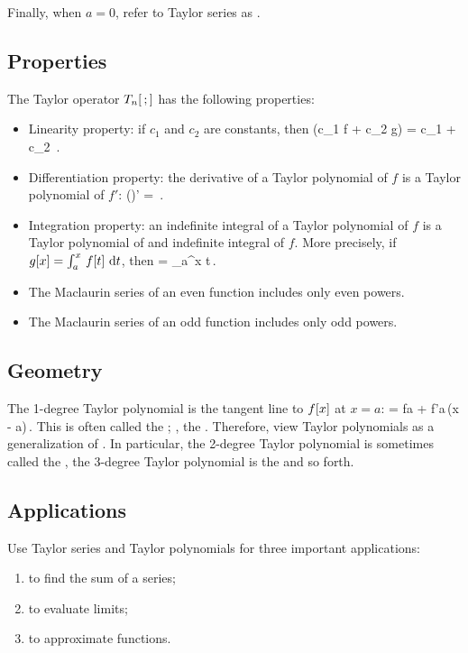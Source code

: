 Finally, when $a = 0$, refer to Taylor series as .


\subsection{Properties}
The Taylor operator $T_{n}{}\!\left[{{}\,;{}}\right]$ has the following properties:
\begin{itemize}
\item Linearity property: if $c_1$ and $c_2$ are constants, then 
\beq
{}(c_1 f + c_2 g) = c_1  + c_2 \,.
\eeq
%
\item Differentiation property: the derivative of a Taylor polynomial of $f$ is a Taylor polynomial of $f'$:
\beq
()' = \,.
\eeq
%
\item Integration property: an indefinite integral of a Taylor polynomial of $f$ is a Taylor polynomial of and indefinite integral of $f$. More precisely, if $g\!\left[{x}\right] = \int_{a}^{x}\,f\!\left[{t}\right]\,\text{d} t$, then
\beq
{} = \int_{a}^{x}\,\,\dx t\,.
\eeq
%
\item The Maclaurin series of an even function includes only even powers.
%
\item The Maclaurin series of an odd function includes only odd powers.
%
\end{itemize}


\subsection{Geometry}
The 1-degree Taylor polynomial is the tangent line to $f\!\left[{x}\right]$ at $x = a$:
\beq
{} = f\vat a + f'\vat a\,(x - a)\,.
\eeq
This is often called the ; \ie, the . Therefore, view Taylor polynomials as a generalization of . In particular, the 2-degree Taylor polynomial is sometimes called the , the 3-degree Taylor polynomial is the  and so forth.


\subsection{Applications}
Use Taylor series and Taylor polynomials for three important applications:
\begin{enumerate}
\item to find the sum of a series;
\item to evaluate limits;
\item to approximate functions.
\end{enumerate}


